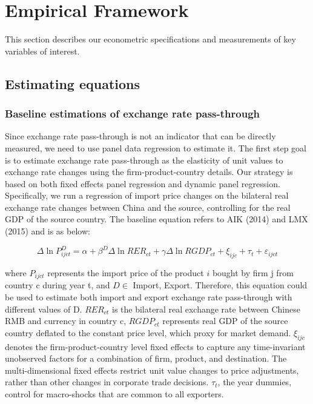 \chapter{Empirical Framework}\label{sec-4.framework}
This section describes our econometric specifications and measurements of key variables of interest.

\section{Estimating equations}

\subsection{Baseline estimations of exchange rate pass-through}

Since exchange rate pass-through is not an indicator that can be directly measured, we need to use panel data regression to estimate it. The first step goal is to estimate exchange rate pass-through as the elasticity of unit values to exchange rate changes using the firm-product-country details. Our strategy is based on both fixed effects panel regression and dynamic panel regression. Specifically, we run a regression of import price changes on the bilateral real exchange rate changes between China and the source, controlling for the real GDP of the source country. The baseline equation refers to AIK (2014)\cite{aik2014} and LMX (2015)\cite{lmx2015} and is as below:

\begin{equation}
\Delta \ln P^{D}_{i j c t}=\alpha+\beta^D \Delta \ln R E R_{c t}+\gamma \Delta \ln R G D P_{c t}+\xi_{i j c}+\tau_{t}+\varepsilon_{i j c t}
\end{equation}

where $P_{ijct}$ represents the import price of the product $i$ bought by firm j from country c during year t, and $D \in$ {Import, Export}. Therefore, this equation could be used to estimate both import and export exchange rate pass-through with different values of D. $R E R_{c t}$ is the bilateral real exchange rate between Chinese RMB and currency in country c, $RGDP_{ct}$ represents real GDP of the source country deflated to the constant price level, which proxy for market demand. $\xi_{ijc}$ denotes the firm-product-country level fixed effects to capture any time-invariant unobserved factors for a combination of firm, product, and destination. The multi-dimensional fixed effects restrict unit value changes to price adjustments, rather than other changes in corporate trade decisions. $\tau_t$, the year dummies, control for macro-shocks that are common to all exporters.

